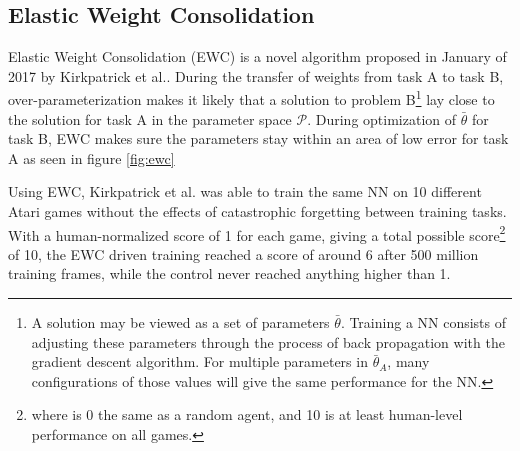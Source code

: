 \subsection{Elastic Weight Consolidation}
Elastic Weight Consolidation (EWC) is a novel algorithm proposed in January of 2017 by Kirkpatrick et al.\cite{ewc}. During the transfer of weights from task A to task B, over-parameterization makes it likely that a solution to problem B\footnote{A solution may be viewed as a set of parameters \(\bar{\theta}\). Training a NN consists of adjusting these parameters through the process of back propagation with the gradient descent algorithm. For multiple parameters in \(\bar{\theta}_{A}\), many configurations of those values will give the same performance for the NN.} lay close to the solution for task A in the parameter space \(\mathcal{P}\). During optimization of \(\bar{\theta}\) for task B, EWC makes sure the parameters stay within an area of low error for task A as seen in figure \ref{fig:ewc}

Using EWC, Kirkpatrick et al.\cite{ewc} was able to train the same NN on 10 different Atari games without the effects of catastrophic forgetting between training tasks. With a human-normalized score of 1 for each game, giving a total possible score\footnote{where is 0 the same as a random agent, and 10 is at least human-level performance on all games.} of 10, the EWC driven training reached a score of around 6 after 500 million training frames, while the control never reached anything higher than 1.

